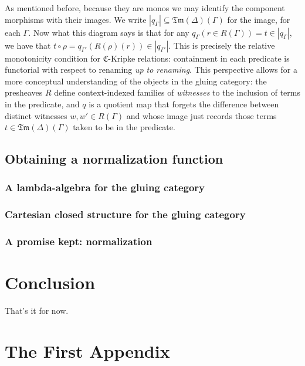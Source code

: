 \documentclass[12pt,twoside]{reedthesis}
\theoremstyle{definition}
\theoremstyle{remark}
\theoremstyle{plain}
\newcommand{\tm}{\mathfrak{Tm}}
\begin{document}
  As mentioned before, because they are monos we may identify the component
  morphisms with their images. We write \( |q_{\Gamma}| \subseteq \tm(\Delta)(\Gamma) \) for the image,
  for each \( \Gamma \). Now what this diagram says is that for any
  \( q_{\Gamma }(r \in R(\Gamma)) = t \in |q_{\Gamma}|\), we have that
  \( t \circ \rho = q_{\Gamma'}(R(\rho)(r)) \in |q_{\Gamma'}|\). This is precisely the relative
  monotonicity condition for $\mathfrak{C}$-Kripke relations: containment in
  each predicate is functorial with respect to renaming \emph{up to renaming}.
  This perspective allows for a more conceptual understanding of the objects in
  the gluing category: the presheaves $R$ define context-indexed families of
  \emph{witnesses} to the inclusion of terms in the predicate, and $q$ is a
  quotient map that forgets the difference between distinct witnesses
  \( w, w' \in R(\Gamma) \) and whose image just records those terms
  \( t \in \tm (\Delta)(\Gamma)\) taken to be in the predicate.

\section{Obtaining a normalization function}
\subsection{A lambda-algebra for the gluing category}
\subsection{Cartesian closed structure for the gluing category}
\subsection{A promise kept: normalization}

\chapter{Conclusion}
\setcounter{chapter}{4}
\setcounter{section}{0}

That's it for now.

\appendix
\chapter{The First Appendix}
\end{document}
